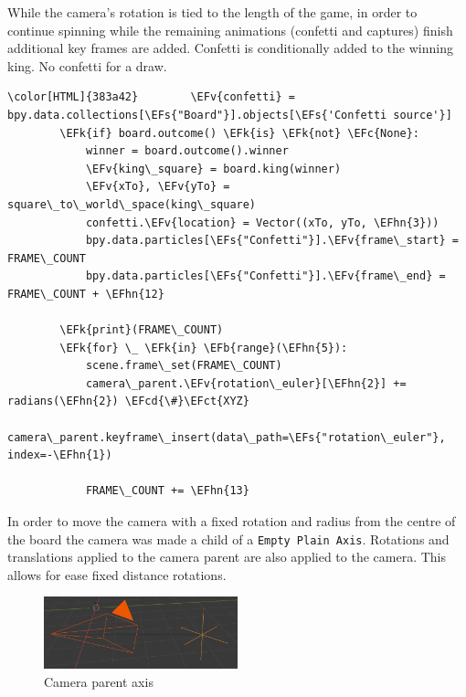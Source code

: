\documentclass[11pt]{article}
\newcommand{\EFk}[1]{\textcolor{EFk}{#1}} %
\newcommand{\EFs}[1]{\textcolor{EFs}{#1}} %
\newcommand{\EFb}[1]{\textcolor{EFb}{#1}} %
\newcommand{\EFct}[1]{\textcolor{EFct}{#1}} %
\newcommand{\EFc}[1]{\textcolor{EFc}{#1}} %
\newcommand{\EFv}[1]{\textcolor{EFv}{#1}} %
\newcommand{\EFcd}[1]{\textcolor{EFcd}{#1}} %
\newcommand{\EFhn}[1]{\textcolor{EFhn}{\textbf{#1}}} %
\begin{document}
While the camera's rotation is tied to the length of the game, in order to
continue spinning while the remaining animations (confetti and captures) finish additional key frames
are added. Confetti is conditionally added to the winning king. No confetti for a draw.
\begin{Code}
\begin{Verbatim}[]
\color[HTML]{383a42}        \EFv{confetti} = bpy.data.collections[\EFs{"Board"}].objects[\EFs{'Confetti source'}]
        \EFk{if} board.outcome() \EFk{is} \EFk{not} \EFc{None}:
            winner = board.outcome().winner
            \EFv{king\_square} = board.king(winner)
            \EFv{xTo}, \EFv{yTo} = square\_to\_world\_space(king\_square)
            confetti.\EFv{location} = Vector((xTo, yTo, \EFhn{3}))
            bpy.data.particles[\EFs{"Confetti"}].\EFv{frame\_start} = FRAME\_COUNT
            bpy.data.particles[\EFs{"Confetti"}].\EFv{frame\_end} = FRAME\_COUNT + \EFhn{12}

        \EFk{print}(FRAME\_COUNT)
        \EFk{for} \_ \EFk{in} \EFb{range}(\EFhn{5}):
            scene.frame\_set(FRAME\_COUNT)
            camera\_parent.\EFv{rotation\_euler}[\EFhn{2}] += radians(\EFhn{2}) \EFcd{\#}\EFct{XYZ}
            camera\_parent.keyframe\_insert(data\_path=\EFs{"rotation\_euler"}, index=-\EFhn{1})

            FRAME\_COUNT += \EFhn{13}
\end{Verbatim}
\end{Code}
In order to move the camera with a fixed rotation and radius from the centre of
the board the camera was made a child of a \texttt{Empty Plain Axis}. Rotations and
translations applied to the camera parent are also applied to the camera. This
allows for ease fixed distance rotations.
\begin{figure}[htbp]
\centering
\includegraphics[width=0.5\textwidth]{Images/camera parent.png}
\caption{\label{camera-parent}Camera parent axis}
\end{figure}
\end{document}
